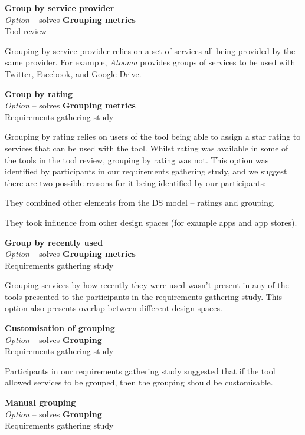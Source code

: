 \textbf{Group by service provider} \\ \emph{Option} -- solves \textbf{Grouping metrics} \\ Tool review

Grouping by service provider relies on a set of services all being provided by the same provider. For example, \emph{Atooma} provides groups of services to be used with Twitter, Facebook, and Google Drive.

\textbf{Group by rating} \\ \emph{Option} -- solves \textbf{Grouping metrics} \\ Requirements gathering study

Grouping by rating relies on users of the tool being able to assign a star rating to services that can be used with the tool. Whilst rating was available in some of the tools in the tool review, grouping by rating was not. This option was identified by participants in our requirements gathering study, and we suggest there are two possible reasons for it being identified by our participants:
\begin{itemize*}
	\item They combined other elements from the DS model -- ratings and grouping.
	\item They took influence from other design spaces (for example apps and app stores).
\end{itemize*}

\textbf{Group by recently used} \\ \emph{Option} -- solves \textbf{Grouping metrics} \\ Requirements gathering study

Grouping services by how recently they were used wasn't present in any of the tools presented to the participants in the requirements gathering study. This option also presents overlap between different design spaces.

\textbf{Customisation of grouping} \\ \emph{Option} -- solves \textbf{Grouping} \\ Requirements gathering study

Participants in our requirements gathering study suggested that if the tool allowed services to be grouped, then the grouping should be customisable.

\textbf{Manual grouping} \\ \emph{Option} -- solves \textbf{Grouping} \\ Requirements gathering study

